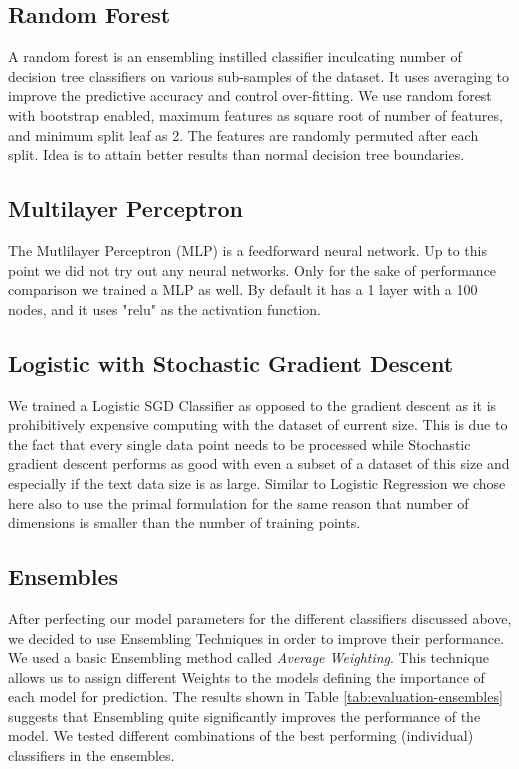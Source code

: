 \subsection{Random Forest}
A random forest is an ensembling instilled classifier inculcating number of decision tree classifiers on various sub-samples of the dataset. It uses averaging to improve the predictive accuracy and control over-fitting. We use random forest with bootstrap enabled, maximum features as square root of number of features, and minimum split leaf as 2. The features are randomly permuted after each split. Idea is to attain better results than normal decision tree boundaries. 

\subsection{Multilayer Perceptron}
The Mutlilayer Perceptron (MLP) is a feedforward neural network. Up to this point we did not try out any neural networks. Only for the sake of performance comparison we trained a MLP as well. By default it has a 1 layer with a 100 nodes, and it uses "relu" as the activation function.

\subsection{Logistic with Stochastic Gradient Descent}
We trained a Logistic SGD Classifier as opposed to the gradient descent as it is prohibitively expensive computing with the dataset of current size. This is due to the fact that every single data point needs to be processed while Stochastic gradient descent performs as good with even a subset of a dataset of this size and especially if the text data size is as large.
Similar to Logistic Regression we chose here also to use the primal formulation for the same reason that number of dimensions is smaller than the number of training points.


\subsection{Ensembles}
After perfecting our model parameters for the different classifiers discussed above, we decided to use Ensembling Techniques in order to improve their performance. We used a basic Ensembling method called \textit{Average Weighting}. This technique allows us to assign different Weights to the models defining the importance of each model for prediction. The results shown in Table \ref{tab:evaluation-ensembles} suggests that Ensembling quite significantly improves the performance of the model. We tested different combinations of the best performing (individual) classifiers in the ensembles.
